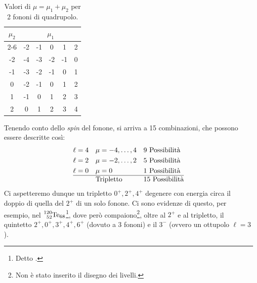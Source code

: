 \begin{table}[!h]
    \centering
    \begin{tabular}{|c|ccccc|}
        \hline
        \multirow{3}{*}{$\mu_2$} & \multicolumn{5}{c|}{$\mu_1$} \\
        \cline{2-6}
         & -2 & -1 & 0 & 1 & 2 \\
        \hline
        -2 & -4 & -3 & -2 & -1 & 0 \\
        -1 & -3 & -2 & -1 & 0 & 1 \\
        0 & -2 & -1 & 0 & 1 & 2 \\
        1 & -1 & 0 & 1 & 2 & 3 \\
        2 & 0 & 1 & 2 & 3 & 4 \\
        \hline
    \end{tabular}
    \caption{Valori di $\mu=\mu_1+\mu_2$ per 2 fononi di quadrupolo.}
    \label{mumu}
\end{table}
\noindent Tenendo conto dello \textit{spin} del fonone, si arriva a 15 combinazioni, che possono essere descritte così:
\begin{displaymath}
\begin{aligned}
&\ell = 4 & &\mu=-4,\dots,4 & &9 \text{ Possibilità} \\
&\ell = 2 & &\mu=-2,\dots,2 & &5 \text{ Possibilità} \\
&\ell = 0 & &\mu=0 & &1 \text{ Possibilità}\\ 
\hline
& & &\text{Tripletto} & &15 \text{ Possibilità} 
\end{aligned}
\end{displaymath}
\noindent Ci aspetteremo dunque un tripletto $0^+,2^+,4^+$ degenere con energia circa il doppio di quella del $2^+$ di un solo fonone. Ci sono evidenze di questo, per esempio, nel $\ce{^{120}_{52}Te_{68}}$\footnote{Detto \textit{}.}, dove però compaiono\footnote{Non è stato inserito il disegno dei livelli.}, oltre al $2^+$ e al tripletto, il quintetto $2^+,0^+,3^+,4^+,6^+$ (dovuto a 3 fononi) e il $3^-$ (ovvero un ottupolo $\ell=3$).

